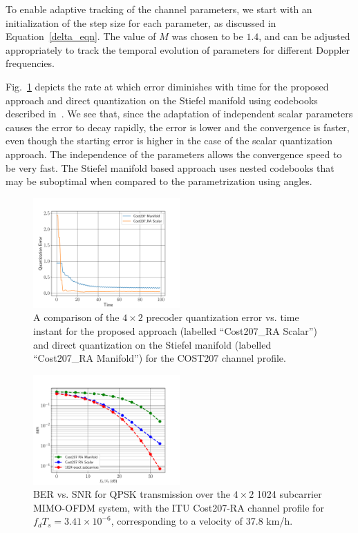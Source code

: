 \documentclass[journal,10pt,twocolumn]{IEEEtran}
\begin{document}
To enable adaptive tracking of the channel parameters, we start with
an initialization of the step size for each parameter, as discussed in
Equation~\ref{delta_eqn}. The value of $M$ was chosen to be $1.4$, and
can be adjusted appropriately to track the temporal evolution of
parameters for different Doppler frequencies.

Fig.~\ref{fig:error_decay} depicts the rate at which error diminishes
with time for the proposed approach and direct quantization on the
Stiefel manifold using codebooks described
in~\cite{Gupt1905:Predictive}. We see that, since the adaptation of
independent scalar parameters causes the error to decay rapidly, the
error is lower and the convergence is faster, even though the starting
error is higher in the case of the scalar quantization approach. The
independence of the parameters allows the convergence speed to be very
fast. The Stiefel manifold based approach uses nested codebooks that
may be suboptimal when compared to the parametrization using angles.

\begin{figure}
\includegraphics[width=0.5\textwidth]{images/qerror.pdf}
\caption{\label{fig:error_decay}A comparison of the $4\times 2$
  precoder quantization error vs. time instant for the proposed
  approach (labelled ``Cost207\_RA Scalar'') and direct quantization
  on the Stiefel manifold (labelled ``Cost207\_RA Manifold'') for the COST207 channel profile.}
\end{figure}

\begin{figure}
\includegraphics[width=0.5\textwidth]{images/ber1024_035}
\caption{BER vs. SNR for QPSK transmission over the $4\times 2$ 1024
  subcarrier MIMO-OFDM system, with the ITU Cost207-RA channel profile
  for $f_dT_s = 3.41\times 10^{-6}$, corresponding to a velocity of 37.8 km/h.}
\label{fig:ber_ped}
\end{figure}
\end{document}
